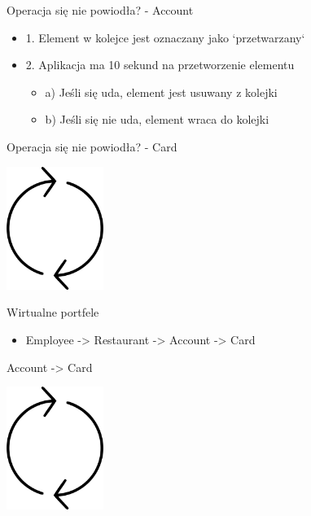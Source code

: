 \documentclass{beamer}
\begin{document}
\begin{frame}{Operacja się nie powiodła? - Account}
	\begin{Large}
		\begin{itemize}[<+->]
			\item 1. Element w kolejce jest oznaczany jako `przetwarzany`
			\item 2. Aplikacja ma 10 sekund na przetworzenie elementu
			\begin{itemize}[<+->]
				\item \Large{a) Jeśli się uda, element jest usuwany z kolejki}
				\item \Large{b) Jeśli się nie uda, element wraca do kolejki}
			\end{itemize}
		\end{itemize}
	\end{Large}
\end{frame}

\begin{frame}{Operacja się nie powiodła? - Card}
	\begin{center}
		\includegraphics[height=4cm]{cykl1.png}
	\end{center}
\end{frame}

\begin{frame}{Wirtualne portfele}
	\begin{huge}
		\begin{itemize}
			\item Employee -> Restaurant -> Account -> Card
		\end{itemize}
	\end{huge}
\end{frame}

\begin{frame}{Account -> Card}
	\begin{center}
		\includegraphics[height=4cm]{cykl1.png}
	\end{center}
\end{frame}
\end{document}

